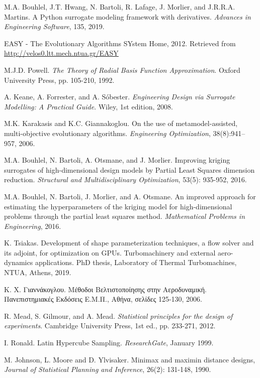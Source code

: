 \documentclass[twoside, 12pt,notitlepage]{report}
\begin{document}
\begin{enumerate}
M.A. Bouhlel, J.T. Hwang, N. Bartoli, R. Lafage, 
J. Morlier, and J.R.R.A. Martins. A Python surrogate 
modeling framework with derivatives. \textit{Advances 
in Engineering Software}, 135, 2019.

EASY - The Evolutionary Algorithms SYstem Home, 2012. 
Retrieved from \url{http://velos0.ltt.mech.ntua.gr/EASY}

M.J.D. Powell. \textit{The Theory of Radial Basis Function 
Approximation}. Oxford University Press, pp. 105-210, 1992.

A. Keane, A. Forrester, and A. Sóbester. 
\textit{Engineering Design via Surrogate Modelling: A 
Practical Guide}. Wiley, 1st edition, 2008.

M.K. Karakasis and K.C. Giannakoglou. On the use of 
metamodel-assisted, multi-objective evolutionary algorithms. 
\textit{Engineering Optimization}, 38(8):941–957, 2006.

M.A. Bouhlel, N. Bartoli, A. Otsmane, and J. Morlier. 
Improving kriging surrogates of high-dimensional design 
models by Partial Least Squares dimension reduction. 
\textit{Structural and Multidisciplinary Optimization}, 
53(5): 935-952, 2016.

M.A. Bouhlel, N. Bartoli, J. Morlier, and A. Otsmane. An 
improved approach for estimating the hyperparameters of 
the kriging model for high-dimensional problems through 
the partial least squares method. \textit{Mathematical 
Problems in Engineering}, 2016.

K. Tsiakas. Development of shape parameterization techniques, a 
flow solver and its adjoint, for optimization on GPUs. 
Turbomachinery and external aero-dynamics applications. PhD thesis, 
Laboratory of Thermal Turbomachines, NTUA, Athens, 2019.

 Κ. Χ. Γιαννάκογλου. Μέθοδοι Βελτιστοποίησης 
στην Αεροδυναμική. Πανεπιστημιακές Εκδόσεις Ε.Μ.Π., 
Αθήνα, σελίδες 125-130, 2006.

R. Mead, S. Gilmour, and  A. Mead. \textit{Statistical 
principles for the design of experiments}. Cambridge 
University Press, 1st ed., pp. 233-271, 2012.

I. Ronald. Latin Hypercube Sampling. \textit{ResearchGate}, 
January 1999.

M. Johnson, L. Moore and D. Ylvisaker. Minimax and maximin 
distance designs, \textit{Journal of Statistical Planning and 
Inference}, 26(2): 131-148, 1990.
 

\end{enumerate}
\end{document}
